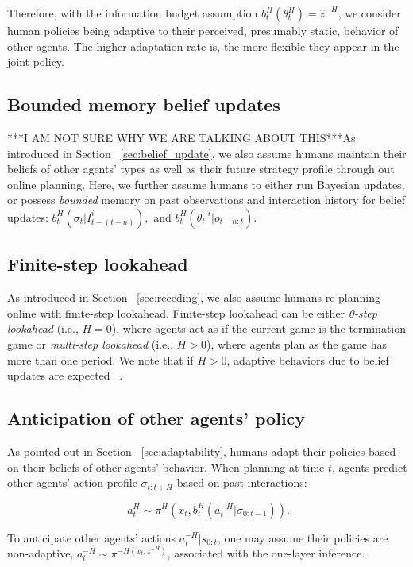 \documentclass[letterpaper, 10 pt, conference]{ieeeconf}  %
\begin{document}
Therefore, with the information budget assumption $b^H_t(\theta^H_t) = \hat{z}^{-H}$, we consider human policies being adaptive to their perceived, presumably static, behavior of other agents. The higher adaptation rate is, the more flexible they 
appear in the joint policy. 

\color{red}\subsection{Bounded memory belief updates}

***I AM NOT SURE WHY WE ARE TALKING ABOUT THIS***As introduced in Section ~\ref{sec:belief_update}, we also assume humans maintain their 
beliefs of other agents' types as well as their future strategy profile through out online planning. Here, we further assume humans to either run Bayesian updates, or possess \textit{bounded} memory on past observations and interaction history for belief updates\cite{nikolaidis2016formalizing}: $b^H_t(\sigma_{t}|I^i_{t-(t-n)}),$ and $b^H_t(\theta^{-i}_t|o_{t-n:t})$.

\subsection{Finite-step lookahead}
As introduced in Section ~\ref{sec:receding}, we also assume humans re-planning online with finite-step lookahead. Finite-step lookahead can be either \textit{0-step lookahead} (i.e., $H=0$), where agents act as if the current game is the termination game or \textit{multi-step lookahead} (i.e., $H>0$), where agents plan as the game has more than one period. We note that if $H>0$, adaptive behaviors due to belief updates are expected ~\cite{nikolaidis2016formalizing}.

\subsection{Anticipation of other agents' policy}
As pointed out in Section ~\ref{sec:adaptability}, humans adapt their policies based on their beliefs of other agents' behavior. When planning at time $t$, agents predict other agents' action profile $\sigma_{t:t+H}$ based on past interactions:

\begin{equation}~\label{eq:human_decision1}
a^H_t \sim \pi^H(x_t, b^H_t(a^{-H}_{t}|\sigma_{0:t-1})).
\end{equation}

To anticipate other agents' actions $a^{-H}_{t}|s_{0:t}$, one may assume 
their policies are non-adaptive, $a^{-H}_t \sim \pi^{-H(x_t,z^{-H})}$, 
associated with the one-layer inference. 
\end{document}
